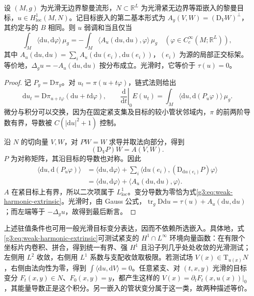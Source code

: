 \begin{proposition}\label{g3:prop:harmonic-map-extrinsic-equation}
	设 \((M,g)\) 为光滑无边界黎曼流形，\(N\subset\mathbb R^L\) 为光滑紧无边界等距嵌入的黎曼目标，\(u\in H^1_{\mathrm{loc}}(M,N)\)。记目标嵌入的第二基本形式为
	\(A_y(V,W)=(\mathrm D_VW)^\perp\)，其约定与的 \(B\) 相同。则 \(u\) 弱调和当且仅当
	\begin{equation}\label{g3:eq:weak-harmonic-extrinsic}
		\int_M\langle\mathrm du,\mathrm d\varphi\rangle\,\mu_g
		=-\int_M\langle A_u(\mathrm du,\mathrm du),\varphi\rangle\,\mu_g
		\quad(\varphi\in C_c^\infty(M;\mathbb R^L)),
	\end{equation}
	其中 \(A_u(\mathrm du,\mathrm du)=\sum_i A_u(\mathrm du(e_i),\mathrm du(e_i))\)，\((e_i)\) 为源的局部正交标架。等价地，\(\Delta_gu=-A_u(\mathrm du,\mathrm du)\) 按分布成立。光滑时，它等价于 \(\tau(u)=0\)。
\end{proposition}
\begin{proof}
	记 \(P_y=\mathrm D\pi_y\)。对 \(u_t=\pi(u+t\varphi)\)，链式法则给出
	\[
		\mathrm du_t=\mathrm D\pi_{u+t\varphi}(\mathrm du+t\mathrm d\varphi),
		\qquad
		\left.\frac{\mathrm d}{\mathrm dt}\right|_0 E(u_t)
		=\int_M\langle\mathrm du,\mathrm d(P_u\varphi)\rangle\,\mu_g.
	\]
	微分与积分可以交换，因为在固定紧支集及目标的较小管状邻域内，\(\pi\) 的前两阶导数有界，导数被 \(C(|\mathrm du|^2+1)\) 控制。

	沿 \(N\) 的切向量 \(V,W\)，对 \(PW=W\) 求导并取法向部分，得到
	\[
		(\mathrm D_VP)W=A(V,W).
	\]
	\(P\) 为对称矩阵，其沿目标的导数也对称。因此
	\[
	\begin{aligned}
		\langle\mathrm du,\mathrm d(P_u\varphi)\rangle
		&=\langle\mathrm du,\mathrm d\varphi\rangle
		 +\sum_i\langle\mathrm du(e_i),(\mathrm D_{\mathrm du(e_i)}P)\varphi\rangle\\
		&=\langle\mathrm du,\mathrm d\varphi\rangle
		 +\langle A_u(\mathrm du,\mathrm du),\varphi\rangle.
	\end{aligned}
	\]
	\(A\) 在紧目标上有界，所以二次项属于 \(L^1_{\mathrm{loc}}\)。变分导数为零恰为式\eqref{g3:eq:weak-harmonic-extrinsic}。光滑时，由 Gauss 公式，\(\operatorname{tr}_g\mathrm D\mathrm du=\tau(u)+A_u(\mathrm du,\mathrm du)\)；而左端等于 \(-\Delta_gu\)，故得到最后断言。
\end{proof}

上述驻值条件也可用一般光滑目标变分表达，因而不依赖所选嵌入。具体地，式\eqref{g3:eq:weak-harmonic-extrinsic}可测试紧支的 \(H^1\cap L^\infty\) 环境向量函数：在有限个坐标片内卷积、拼合，得到统一有界、强 \(H^1\) 且沿子列几乎处处收敛的光滑测试；左侧用 \(L^2\) 收敛，右侧用 \(L^1\) 系数与支配收敛取极限。若测试场 \(V(x)\in\mathrm T_{u(x)}N\)，右侧由法向性为零，得到 \(\int\langle\mathrm du,\mathrm dV\rangle=0\)。任意紧支、对 \((t,x,y)\) 光滑的目标变分 \(F_t(x,y)\in N\)、\(F_0(x,y)=y\)，都产生这样的 \(V(x)=\partial_tF_t(x,u(x))|_0\)，其能量导数正是这个积分。另一嵌入的管状变分属于这一类，故两种描述等价。

